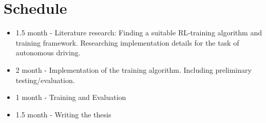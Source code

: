 \chapter{Schedule}
\label{cha:Schedule}


\begin{itemize}
    \item 1.5 month - Literature research: Finding a suitable RL-training algorithm and training framework. Researching implementation details for the task of autonomous driving. 
    \item 2 month - Implementation of the training algorithm. Including preliminary testing/evaluation.
    \item 1 month - Training and Evaluation
    \item 1.5 month - Writing the thesis
\end{itemize}